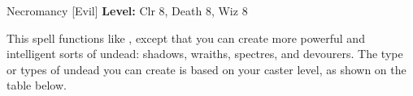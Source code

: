 {Necromancy [Evil]}
{
	\textbf{Level:}
	Clr 8, Death 8, Wiz 8\\
}
{
	This spell functions like , except that you can create more powerful and intelligent sorts of undead: shadows, wraiths, spectres, and devourers. The type or types of undead you can create is based on your caster level, as shown on the table below.


}
